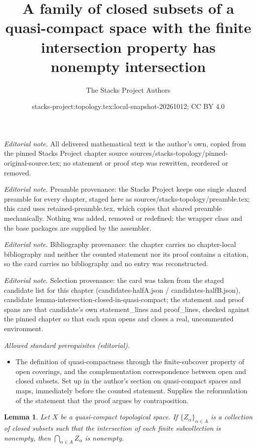 \documentclass[10pt,a4paper]{amsart}
\title{A family of closed subsets of a quasi-compact space with the finite intersection property has nonempty intersection}
\author{The Stacks Project Authors}
\date{stacks-project:topology.tex:local-snapshot-20261012; CC BY 4.0}
\theoremstyle{plain}
\newtheorem{lemma}[subsection]{Lemma}
\theoremstyle{definition}
\theoremstyle{remark}
\numberwithin{equation}{subsection}
\begin{document}
\maketitle
\noindent\textit{Editorial note.} All delivered mathematical text is the author's own, copied from the pinned Stacks Project chapter source sources/stacks-topology/pinned-original-source.tex; no statement or proof step was rewritten, reordered or removed.\par\medskip
\noindent\textit{Editorial note.} Preamble provenance: the Stacks Project keeps one single shared preamble for every chapter, staged here as sources/stacks-topology/preamble.tex; this card uses retained-preamble.tex, which copies that shared preamble mechanically. Nothing was added, removed or redefined; the wrapper class and the base packages are supplied by the assembler.\par\medskip
\noindent\textit{Editorial note.} Bibliography provenance: the chapter carries no chapter-local bibliography and neither the counted statement nor its proof contains a citation, so the card carries no bibliography and no entry was reconstructed.\par\medskip
\noindent\textit{Editorial note.} Selection provenance: the card was taken from the staged candidate list for this chapter (candidates-halfA.json / candidates-halfB.json), candidate lemma-intersection-closed-in-quasi-compact; the statement and proof spans are that candidate's own statement\_lines and proof\_lines, checked against the pinned chapter so that each span opens and closes a real, uncommented environment.\par\medskip
\noindent\textit{Allowed standard prerequisites (editorial).}\begin{itemize}
\item The definition of quasi-compactness through the finite-subcover property of open coverings, and the complementation correspondence between open and closed subsets. Set up in the author's section on quasi-compact spaces and maps, immediately before the counted statement. Supplies the reformulation of the statement that the proof argues by contraposition.
\end{itemize}\medskip
\begin{lemma}
\label{lemma-intersection-closed-in-quasi-compact}
Let $X$ be a quasi-compact topological space.
If $\{Z_\alpha\}_{\alpha \in A}$ is a collection of closed subsets
such that the intersection of each finite subcollection
is nonempty, then $\bigcap_{\alpha \in A} Z_\alpha$ is nonempty.
\end{lemma}
\end{document}
